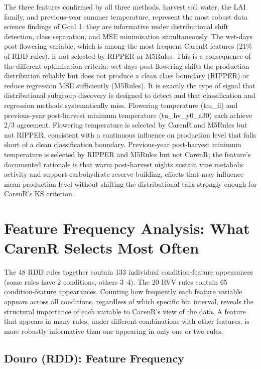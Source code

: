 The three features confirmed by all three methods, harvest soil water, the LAI family, and previous-year summer temperature, represent the most robust data science findings of Goal 1: they are informative under distributional shift detection, class separation, and MSE minimisation simultaneously. The wet-days post-flowering variable, which is among the most frequent CarenR features (21\% of RDD rules), is not selected by RIPPER or M5Rules. This is a consequence of the different optimisation criteria: wet-days post-flowering shifts the production distribution reliably but does not produce a clean class boundary (RIPPER) or reduce regression MSE sufficiently (M5Rules). It is exactly the type of signal that distributional subgroup discovery is designed to detect and that classification and regression methods systematically miss. Flowering temperature (tm\_fl) and previous-year post-harvest minimum temperature (tn\_hv\_y0\_a30) each achieve 2/3 agreement. Flowering temperature is selected by CarenR and M5Rules but not RIPPER, consistent with a continuous influence on production level that falls short of a clean classification boundary. Previous-year post-harvest minimum temperature is selected by RIPPER and M5Rules but not CarenR; the feature's documented rationale is that warm post-harvest nights sustain vine metabolic activity and support carbohydrate reserve building, effects that may influence mean production level without shifting the distributional tails strongly enough for CarenR's KS criterion.




\section{Feature Frequency Analysis: What CarenR Selects Most Often}\label{sec:feature_frequency_analysis_what}

The 48 RDD rules together contain 133 individual condition-feature appearances (some rules have 2 conditions, others 3--4). The 20 RVV rules contain 65 condition-feature appearances. Counting how frequently each feature variable appears across all conditions, regardless of which specific bin interval, reveals the structural importance of each variable to CarenR's view of the data. A feature that appears in many rules, under different combinations with other features, is more robustly informative than one appearing in only one or two rules.


\subsection{Douro (RDD): Feature Frequency}\label{sub:douro_rdd_feature_frequency}

